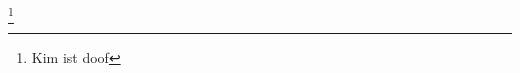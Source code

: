 \documentclass{article}
\begin{document}
\cite{book1} \cite{book2} \cite{book1,book2} \footnote{Kim ist doof}

\end{document}
